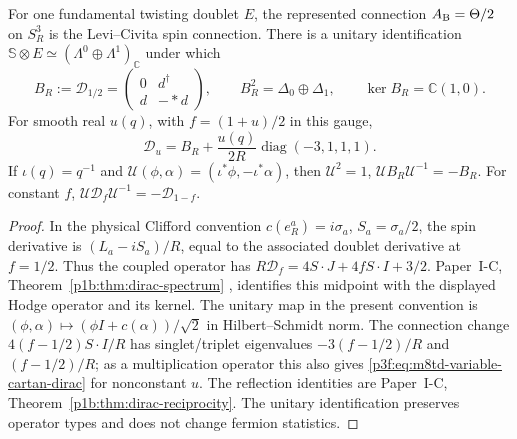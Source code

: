 \documentclass[11pt,a4paper]{article}
\begin{document}
\begin{theorem}
\label{p3f:thm:m8td-hodge-dirac}
For one fundamental twisting doublet $E$, the represented connection
$A_{\rm B}=\Theta/2$ on $S_R^3$ is the Levi--Civita spin connection.
There is a unitary identification
$\mathbb S\otimes E\simeq(\Lambda^0\oplus\Lambda^1)_{\mathbb C}$ under which
\begin{equation}
 B_R:=\mathcal D_{1/2}=
 \begin{pmatrix}0&d^\dagger\\d&-*d\end{pmatrix},\qquad
 B_R^2=\Delta_0\oplus\Delta_1,
 \qquad\ker B_R=\mathbb C(1,0).
 \label{p3f:eq:m8td-hodge-dirac}
\end{equation}
For smooth real $u(q)$, with $f=(1+u)/2$ in this gauge,
\begin{equation}
 \mathcal D_u=B_R+\frac{u(q)}{2R}\operatorname{diag}(-3,1,1,1).
 \label{p3f:eq:m8td-variable-cartan-dirac}
\end{equation}
If $\iota(q)=q^{-1}$ and
$\mathcal U(\phi,\alpha)=(\iota^*\phi,-\iota^*\alpha)$, then
$\mathcal U^2=1$, $\mathcal UB_R\mathcal U^{-1}=-B_R$. For constant $f$,
$\mathcal U\mathcal D_f\mathcal U^{-1}=-\mathcal D_{1-f}$.
\end{theorem}
\begin{proof}
In the physical Clifford convention \(c(e_R^a)=i\sigma_a\),
\(S_a=\sigma_a/2\), the spin derivative is \((L_a-iS_a)/R\),
equal to the associated doublet derivative at \(f=1/2\). Thus the
coupled operator has
\(R\mathcal D_f=4S\cdot J+4fS\cdot I+3/2\).
Paper~I-C, Theorem~\ref{p1b:thm:dirac-spectrum}
\cite{Kugelmann2026Paper1C}, identifies this midpoint with the displayed
Hodge operator and its kernel. The unitary map in the present convention is
\((\phi,\alpha)\mapsto(\phi I+c(\alpha))/\sqrt2\) in Hilbert--Schmidt norm.
The connection change
\(4(f-1/2)S\cdot I/R\) has singlet/triplet eigenvalues
\(-3(f-1/2)/R\) and \((f-1/2)/R\); as a multiplication operator this
also gives \eqref{p3f:eq:m8td-variable-cartan-dirac} for nonconstant \(u\).
The reflection identities are Paper~I-C,
Theorem~\ref{p1b:thm:dirac-reciprocity}. The unitary identification
preserves operator types and does not change fermion statistics.
\end{proof}
\end{document}
